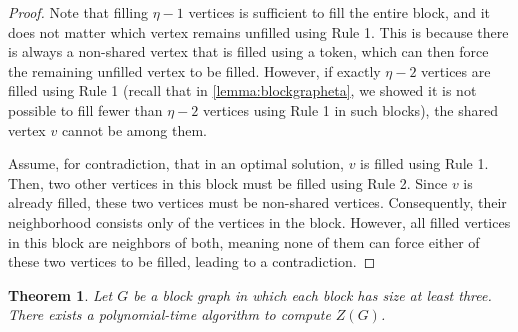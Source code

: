 \documentclass[11pt]{article}
\theoremstyle{plain}
\newtheorem{theorem}{Theorem}[section]
\theoremstyle{definition}
\theoremstyle{remark}
\begin{document}
\begin{proof}
    Note that filling $\eta - 1$ vertices is sufficient to fill the entire block, and it does not matter which vertex remains unfilled using Rule 1. This is because there is always a non-shared vertex that is filled using a token, which can then force the remaining unfilled vertex to be filled. However, if exactly $\eta - 2$ vertices are filled using Rule 1 (recall that in \ref{lemma:blockgrapheta}, we showed it is not possible to fill fewer than $\eta - 2$ vertices using Rule 1 in such blocks), the shared vertex $v$ cannot be among them.  

    Assume, for contradiction, that in an optimal solution, $v$ is filled using Rule 1. Then, two other vertices in this block must be filled using Rule 2. Since $v$ is already filled, these two vertices must be non-shared vertices. Consequently, their neighborhood consists only of the vertices in the block. However, all filled vertices in this block are neighbors of both, meaning none of them can force either of these two vertices to be filled, leading to a contradiction.
\end{proof}


\begin{theorem} \label{Theorem: Z algorithm block graph}
Let $G$ be a block graph in which each block has size at least three. There exists a polynomial-time algorithm to compute $Z(G)$.
\end{theorem}
\end{document}

